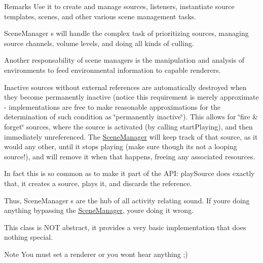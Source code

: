 \begin{DoxyRemark}{Remarks}
Use it to create and manage sources, listeners, instantiate source templates, scenes, and other various scene management tasks. 
\end{DoxyRemark}
\begin{DoxyParagraph}{Scene\+Manager s will handle the complex task of prioritizing sources, managing}
source channels, volume levels, and doing all kinds of culling. 
\end{DoxyParagraph}
\begin{DoxyParagraph}{Another responsability of scene managers is the manipulation and analysis of}
environments to feed environmental information to capable renderers. 
\end{DoxyParagraph}
\begin{DoxyParagraph}{Inactive sources without external references are automatically destroyed when}
they become permanently inactive (notice this requirement is merely approximate -\/ implementations are free to make reasonable approximations for the determination of such condition as \char`\"{}permanently inactive\char`\"{}). This allows for \char`\"{}fire \& forget\char`\"{} sources, where the source is activated (by calling start\+Playing), and then immediately unreferenced. The \hyperlink{classAudio_1_1SceneManager}{Scene\+Manager} will keep track of that source, as it would any other, until it stops playing (make sure though it\textquotesingle{}s not a looping source!), and will remove it when that happens, freeing any associated resources. 
\end{DoxyParagraph}
\begin{DoxyParagraph}{In fact this is so common as to make it part of the A\+PI\+: play\+Source does exactly}
that, it creates a source, plays it, and discards the reference. 
\end{DoxyParagraph}
\begin{DoxyParagraph}{Thus, Scene\+Manager s are the hub of all activity relating sound. If you\textquotesingle{}re doing}
anything bypassing the \hyperlink{classAudio_1_1SceneManager}{Scene\+Manager}, you\textquotesingle{}re doing it wrong. 
\end{DoxyParagraph}
\begin{DoxyParagraph}{This class is N\+OT abstract, it provides a very basic implementation that does}
nothing special. 
\end{DoxyParagraph}
\begin{DoxyNote}{Note}
You must set a renderer or you won\textquotesingle{}t hear anything ;) 
\end{DoxyNote}


